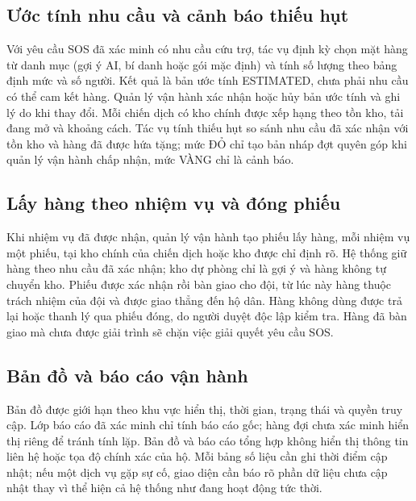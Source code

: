 \documentclass[12pt,a4paper,oneside]{report}
\begin{document}
\subsection{Ước tính nhu cầu và cảnh báo thiếu hụt}
Với yêu cầu SOS đã xác minh có nhu cầu cứu trợ, tác vụ định kỳ chọn mặt hàng từ danh mục (gợi ý AI, bí danh hoặc gói mặc định) và tính số lượng theo bảng định mức và số người. Kết quả là bản ước tính ESTIMATED, chưa phải nhu cầu có thể cam kết hàng. Quản lý vận hành xác nhận hoặc hủy bản ước tính và ghi lý do khi thay đổi. Mỗi chiến dịch có kho chính được xếp hạng theo tồn kho, tải đang mở và khoảng cách. Tác vụ tính thiếu hụt so sánh nhu cầu đã xác nhận với tồn kho và hàng đã được hứa tặng; mức ĐỎ chỉ tạo bản nháp đợt quyên góp khi quản lý vận hành chấp nhận, mức VÀNG chỉ là cảnh báo.

\subsection{Lấy hàng theo nhiệm vụ và đóng phiếu}
Khi nhiệm vụ đã được nhận, quản lý vận hành tạo phiếu lấy hàng, mỗi nhiệm vụ một phiếu, tại kho chính của chiến dịch hoặc kho được chỉ định rõ. Hệ thống giữ hàng theo nhu cầu đã xác nhận; kho dự phòng chỉ là gợi ý và hàng không tự chuyển kho. Phiếu được xác nhận rồi bàn giao cho đội, từ lúc này hàng thuộc trách nhiệm của đội và được giao thẳng đến hộ dân. Hàng không dùng được trả lại hoặc thanh lý qua phiếu đóng, do người duyệt độc lập kiểm tra. Hàng đã bàn giao mà chưa được giải trình sẽ chặn việc giải quyết yêu cầu SOS.

\subsection{Bản đồ và báo cáo vận hành}
Bản đồ được giới hạn theo khu vực hiển thị, thời gian, trạng thái và quyền truy cập. Lớp báo cáo đã xác minh chỉ tính báo cáo gốc; hàng đợi chưa xác minh hiển thị riêng để tránh tính lặp. Bản đồ và báo cáo tổng hợp không hiển thị thông tin liên hệ hoặc tọa độ chính xác của hộ. Mỗi bảng số liệu cần ghi thời điểm cập nhật; nếu một dịch vụ gặp sự cố, giao diện cần báo rõ phần dữ liệu chưa cập nhật thay vì thể hiện cả hệ thống như đang hoạt động tức thời.
\end{document}
